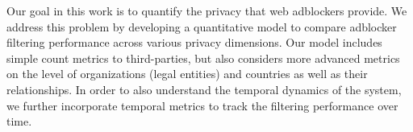 \documentclass[compsoc, conference, letterpaper, 10pt, times]{IEEEtran}
\begin{document}

















Our goal in this work is to quantify the privacy that web adblockers provide. We address this problem by developing a quantitative model to compare adblocker filtering performance across various privacy dimensions. Our model includes simple count metrics to third-parties, but also considers more advanced metrics on the level of organizations (legal entities) and countries as well as their relationships. In order to also understand the temporal dynamics of the system, we further incorporate temporal metrics to track the filtering performance over time.

\end{document}

